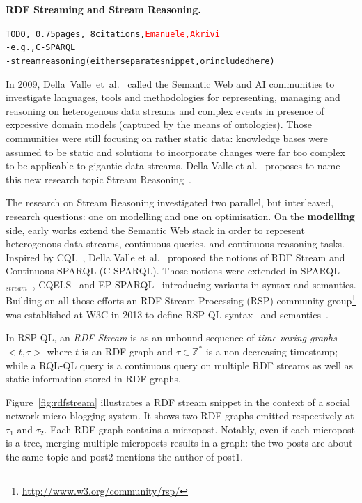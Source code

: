 \textbf{RDF Streaming and Stream Reasoning.}
\begin{alltt}TODO\scriptsize, ~0.75 pages, ~8 citations, \textcolor{red}{Emanuele, Akrivi}
- e.g., C-SPARQL \cite{barbieri_et_al_2009}
- stream reasoning (either separate snippet, or included here)
\end{alltt}

In 2009, Della~Valle~et~al.~\cite{DBLP:journals/expert/ValleCHF09} called the Semantic Web and AI communities to investigate languages, tools and methodologies for representing, managing and reasoning on heterogenous data streams and complex events in presence of expressive domain models (captured by the means of ontologies). Those communities were still focusing on rather static data: knowledge bases were assumed to be static and solutions to incorporate changes were far too complex to be applicable to gigantic data streams. Della Valle et al.~\cite{DBLP:journals/expert/ValleCHF09} proposes to name this new research topic Stream Reasoning~\cite{DellAglioDataScience2017}.

\sloppy The research on Stream Reasoning investigated two parallel, but interleaved, research questions: one on modelling and one on optimisation. On the \textbf{modelling} side, early works extend the Semantic Web stack \cite{DBLP:books/daglib/0036180} in order to represent heterogenous data streams, continuous queries, and continuous reasoning tasks. Inspired by CQL~\cite{arasu_widom_2004}, Della Valle et al.~\cite{DBLP:conf/fis/ValleCBBC08} proposed the notions of RDF Stream and Continuous SPARQL (C-SPARQL). Those notions were extended in SPARQL$_{stream}$~\cite{Calbimonte2010}, CQELS~\cite{LePhuoc2012c} and EP-SPARQL~\cite{DBLP:journals/semweb/AnicicRFS12} introducing variants in syntax and semantics. Building on all those efforts an RDF Stream Processing (RSP) community group\footnote{\url{http://www.w3.org/community/rsp/}} was established at W3C in 2013  to define RSP-QL syntax~\cite{DBLP:conf/esws/DellAglioCVC15} and semantics~\cite{DBLP:journals/ijswis/DellAglioVCC14}.

In RSP-QL, an \textit{RDF Stream} is as an unbound sequence of \emph{time-varing graphs} $< t,\tau>$ where $t$ is an RDF graph and $\tau \in \mathbb{Z}^{*}$ is a non-decreasing timestamp; while a RQL-QL query is a continuous query on multiple RDF streams as well as static information stored in RDF graphs. 

Figure~\ref{fig:rdfstream} illustrates a RDF stream snippet in the context of a social network micro-blogging system. It shows two RDF graphs emitted respectively at $\tau_1$ and $\tau_2$. Each RDF graph contains a micropost. Notably, even if each micropost is a tree, merging multiple microposts results in a graph: the two posts are about the same topic and \textsf{post2} mentions the author of \textsf{post1}.


